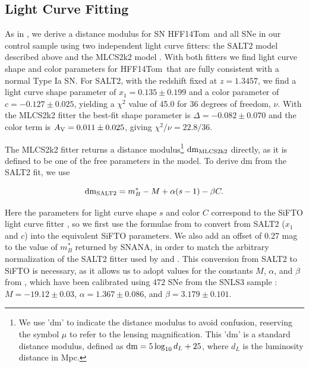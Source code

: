 \documentclass[iop]{emulateapj}
\def\P14{\citetalias{Patel:2014}}
\def\tomas{HFF14Tom}
\begin{document}
\subsection{Light Curve Fitting}
\label{sec:LightCurveFitting}


As in \P14, we derive a distance modulus for
SN \tomas\ and all SNe in our control sample using two independent
light curve fitters: the SALT2 model described above and the MLCS2k2
model \citep{Jha:2007}.    With both fitters we find light curve
shape and color parameters for \tomas\ that are fully consistent with
a normal Type Ia SN.  For SALT2, with the
redshift fixed at $z=1.3457$, we find a light curve shape
parameter of $x_1=0.135\pm0.199$ and a color parameter of
$c=-0.127\pm0.025$, yielding a $\chi^2$ value of 45.0 for 36 degrees
of freedom, $\nu$.  With the MLCS2k2 fitter the best-fit shape
parameter is $\Delta=-0.082\pm0.070$ and the color term is
$A_{\rm V}=0.011\pm0.025$, giving $\chi^2/\nu=22.8/36$.


 The MLCS2k2 fitter returns a distance
modulus\footnote{We use 'dm' to indicate the distance modulus to avoid
confusion, reserving the symbol $\mu$ to refer to the lensing
magnification. This 'dm' is a standard distance modulus, defined as
${\rm dm}=5\log_{10}d_L+25$, where $d_L$ is the luminosity distance in
Mpc.}  $\rm{dm}_{\rm MLCS2k2}$ directly, as it is defined to be one of
the free parameters in the model. To derive dm from the SALT2 fit, we
use

\begin{equation} \label{eqn:dmSALT2}
 {\rm dm}_{\rm SALT2} = m_B^* - M + \alpha(s-1) - \beta C.
\end{equation}

\noindent  Here the parameters for light curve shape $s$ and color $C$ 
correspond to the SiFTO light curve fitter \citep{Conley:2008}, so we
first use the formulae from \citet{Guy:2010} to convert from SALT2
($x_1$ and $c$) into the equivalent SiFTO parameters.  We also add an
offset of 0.27 mag to the value of $m_B^*$ returned by SNANA, in order
to match the arbitrary normalization of the SALT2 fitter used
by \citet{Guy:2010} and \citet{Sullivan:2011}. This conversion from SALT2 to SiFTO is necessary, as it allows
us to adopt values for the constants $M$, $\alpha$, and $\beta$
from \citet{Sullivan:2011}, which have been calibrated using 472 SNe
from the SNLS3 sample \citep{Conley:2011}: $M=-19.12\pm0.03$,
$\alpha=1.367\pm0.086$, and $\beta=3.179\pm0.101$.


\end{document}
